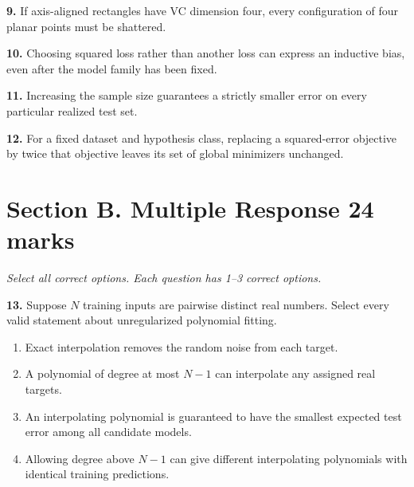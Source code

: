\documentclass[11pt,a4paper]{article}
\begin{document}
\par\noindent\begin{minipage}{\linewidth}
\textbf{9.} If axis-aligned rectangles have VC dimension four, every configuration of four planar points must be shattered.
\end{minipage}\par\vspace{3mm}
\par\noindent\begin{minipage}{\linewidth}
\textbf{10.} Choosing squared loss rather than another loss can express an inductive bias, even after the model family has been fixed.
\end{minipage}\par\vspace{3mm}
\par\noindent\begin{minipage}{\linewidth}
\textbf{11.} Increasing the sample size guarantees a strictly smaller error on every particular realized test set.
\end{minipage}\par\vspace{3mm}
\par\noindent\begin{minipage}{\linewidth}
\textbf{12.} For a fixed dataset and hypothesis class, replacing a squared-error objective by twice that objective leaves its set of global minimizers unchanged.
\end{minipage}\par\vspace{3mm}
\newpage\section*{Section B. Multiple Response \hfill 24 marks}
\textit{Select all correct options. Each question has 1--3 correct options.}\par
\par\noindent\begin{minipage}{\linewidth}
\textbf{13.} Suppose \(N\) training inputs are pairwise distinct real numbers. Select every valid statement about unregularized polynomial fitting.
\begin{enumerate}[label=(\Alph*),leftmargin=8mm,itemsep=2pt,topsep=2pt]
\item Exact interpolation removes the random noise from each target.
\item A polynomial of degree at most \(N-1\) can interpolate any assigned real targets.
\item An interpolating polynomial is guaranteed to have the smallest expected test error among all candidate models.
\item Allowing degree above \(N-1\) can give different interpolating polynomials with identical training predictions.
\end{enumerate}

\end{minipage}\par\vspace{3mm}
\end{document}
